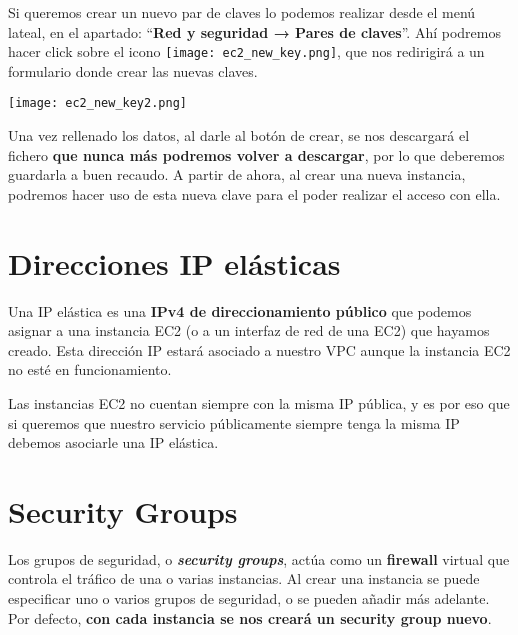 Si queremos crear un nuevo par de claves lo podemos realizar desde el menú lateal, en el apartado: “\textbf{Red y seguridad → Pares de claves}”. Ahí podremos hacer click sobre el icono \texttt{[image: ec2\_new\_key.png]}, que nos redirigirá a un formulario donde crear las nuevas claves.

\begin{center}
	\texttt{[image: ec2\_new\_key2.png]}
\end{center}

Una vez rellenado los datos, al darle al botón de crear, se nos descargará el fichero \textbf{que nunca más podremos volver a descargar}, por lo que deberemos guardarla a buen recaudo. A partir de ahora, al crear una nueva instancia, podremos hacer uso de esta nueva clave para el poder realizar el acceso con ella.



\chapter{Direcciones IP elásticas}

Una IP elástica es una \textbf{IPv4 de direccionamiento público} que podemos asignar a una instancia EC2 (o a un interfaz de red de una EC2) que hayamos creado. Esta dirección IP estará asociado a nuestro VPC aunque la instancia EC2 no esté en funcionamiento.


Las instancias EC2 no cuentan siempre con la misma IP pública, y es por eso que si queremos que nuestro servicio públicamente siempre tenga la misma IP debemos asociarle una IP elástica.


\chapter{Security Groups}

Los grupos de seguridad, o \textbf{\textit{security groups}}, actúa como un \textbf{firewall} virtual que controla el tráfico de una o varias instancias. Al crear una instancia se puede especificar uno o varios grupos de seguridad, o se pueden añadir más adelante. Por defecto, \textbf{con cada instancia se nos creará un security group nuevo}.


